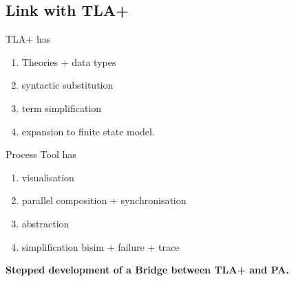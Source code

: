 \documentclass[]{article}
\begin{document}
 \subsection{Link with TLA+} 
 \noindent\begin{center}\begin{minipage}{0.45\textwidth}
 TLA+ has 
  \begin{enumerate}
  \item Theories + data types
  \item syntactic substitution
  \item term simplification
  \item expansion to finite state model.
  \end{enumerate}
 \end{minipage}
 \begin{minipage}{0.5\textwidth} Process Tool has
   \begin{enumerate}
   \item visualisation
   \item parallel composition + synchronisation
   \item abstraction
   \item simplification  bisim + failure + trace
    
   \end{enumerate}
 \end{minipage}
 \end{center}
 
 
  {\bf Stepped development of a Bridge between TLA+ and PA.}
 
 
  
\end{document}

